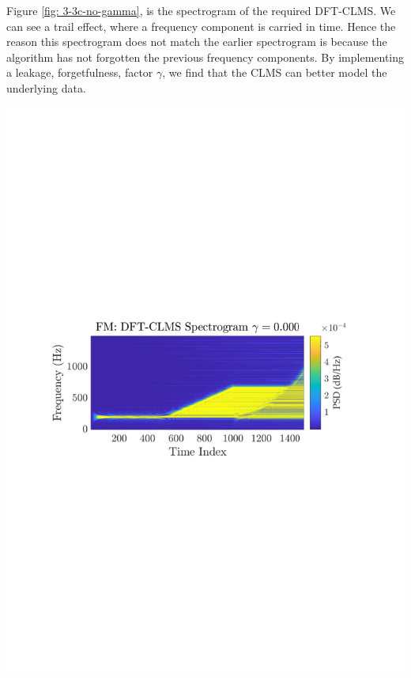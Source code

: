 \documentclass[12pt]{article}
\begin{document}
			\begin{minipage}[b]{0.49\textwidth}
				Figure \ref{fig: 3-3c-no-gamma}, is the spectrogram of the required DFT-CLMS. We can see a trail effect, where a frequency component is carried in time. Hence the reason this spectrogram does not match the earlier spectrogram is because the algorithm has not forgotten the previous frequency components. By implementing a leakage, forgetfulness, factor $\gamma$, we find that the CLMS can better model the underlying data.
			\end{minipage}%
			\begin{minipage}{0.04\textwidth}
				\hspace*{0.04\textwidth}
			\end{minipage}%
			\begin{minipage}[t]{0.49\textwidth}
				\centering
				\includegraphics[trim={2.2cm 11.2cm 3.15cm  11.2cm}, clip, width=\textwidth]{../MATLAB/figures/q3_3c_fig01.pdf} 
				
				\captionsetup{justification=centering}
				\label{fig: 3-3c-no-gamma}
			\end{minipage}%
		
\end{document}
